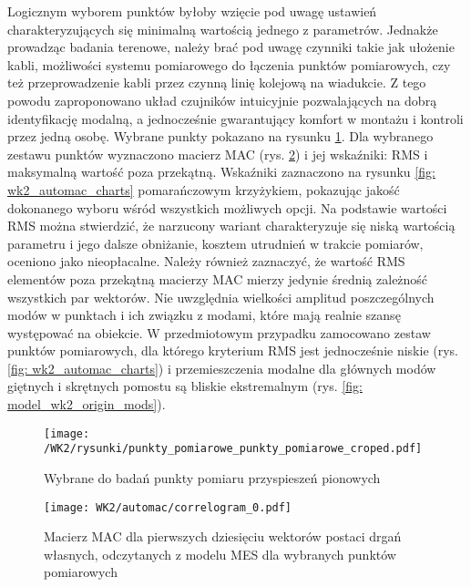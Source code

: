 Logicznym wyborem punktów byłoby wzięcie pod uwagę ustawień charakteryzujących się minimalną wartością jednego z parametrów. Jednakże prowadząc badania terenowe, należy brać pod uwagę czynniki takie jak ułożenie kabli, możliwości systemu pomiarowego do łączenia punktów pomiarowych, czy też przeprowadzenie kabli przez czynną linię kolejową na wiadukcie. Z tego powodu zaproponowano układ czujników intuicyjnie pozwalających na dobrą identyfikację modalną, a jednocześnie gwarantujący komfort w montażu i kontroli przez jedną osobę. Wybrane punkty pokazano na rysunku \ref{fig: wk2_automac_points_choosen}. Dla wybranego zestawu punktów wyznaczono macierz MAC (rys. \ref{fig: wk2_automac_correlogram}) i jej wskaźniki: RMS i maksymalną wartość poza przekątną. Wskaźniki zaznaczono na rysunku \ref{fig: wk2_automac_charts} pomarańczowym krzyżykiem, pokazując jakość dokonanego wyboru wśród wszystkich możliwych opcji. Na podstawie wartości RMS można stwierdzić, że narzucony wariant charakteryzuje się niską wartością parametru i jego dalsze obniżanie, kosztem utrudnień w trakcie pomiarów, oceniono jako nieopłacalne. Należy również zaznaczyć, że wartość RMS elementów poza przekątną macierzy MAC mierzy jedynie średnią zależność wszystkich par wektorów. Nie uwzględnia wielkości amplitud poszczególnych modów w punktach i ich związku z modami, które mają realnie szansę występować na obiekcie. W przedmiotowym przypadku zamocowano zestaw punktów pomiarowych, dla którego kryterium RMS jest jednocześnie niskie (rys. \ref{fig: wk2_automac_charts}) i przemieszczenia modalne dla głównych modów giętnych i skrętnych pomostu są bliskie ekstremalnym (rys. \ref{fig: model_wk2_origin_mods}).


\begin{figure}[hbt!]
	\centering
	\texttt{[image: /WK2/rysunki/punkty\_pomiarowe\_punkty\_pomiarowe\_croped.pdf]}
	\captionsetup{justification=centering}
	\caption{Wybrane do badań punkty pomiaru przyspieszeń pionowych}
	\label{fig: wk2_automac_points_choosen}
\end{figure}


\begin{figure}[hbt!]
	\centering
	\texttt{[image: WK2/automac/correlogram\_0.pdf]}
	\captionsetup{justification=centering}
	\caption{Macierz MAC dla pierwszych dziesięciu wektorów postaci drgań własnych, odczytanych z modelu MES dla wybranych punktów pomiarowych}
	\label{fig: wk2_automac_correlogram}
\end{figure}


